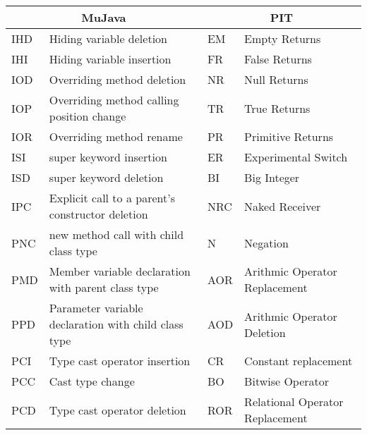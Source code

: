 \documentclass[../main]{subfiles}
\begin{document}
\begin{table}[htb]
\centering
\begin{tabular}{|l|l|l|l|}
\hline
\multicolumn{2}{|c|}{\textbf{ MuJava}}                           & \multicolumn{2}{|c|}{\textbf{PIT}}                      \\ \hline
IHD & Hiding variable deletion                                  & EM                    & Empty Returns                   \\ \hline
IHI & Hiding variable   insertion                               & FR                    & False Returns                   \\ \hline
IOD & Overriding method   deletion                              & NR                    & Null Returns                    \\ \hline
IOP & Overriding method   calling position change               & TR                    & True Returns                    \\ \hline
IOR & Overriding method   rename                                & PR                    & Primitive Returns               \\ \hline
ISI & super keyword insertion                                   & ER                    & Experimental Switch             \\ \hline
ISD & super keyword deletion                                    & BI                    & Big Integer                     \\ \hline
IPC & Explicit call to a   parent’s constructor deletion        & NRC                   & Naked Receiver                  \\ \hline
PNC & new method call with   child class type                   & N                     & Negation                        \\ \hline
PMD & Member variable   declaration with parent class type      & AOR                   & Arithmic Operator Replacement   \\ \hline
PPD & Parameter variable   declaration with child class type    & AOD                   & Arithmic Operator Deletion      \\ \hline
PCI & Type cast operator   insertion                            & CR                    & Constant replacement            \\ \hline
PCC & Cast type change                                          & BO                    & Bitwise Operator                \\ \hline
PCD & Type cast operator   deletion                             & ROR                   & Relational Operator Replacement \\ \hline

\end{tabular}
\end{table}
\end{document}
